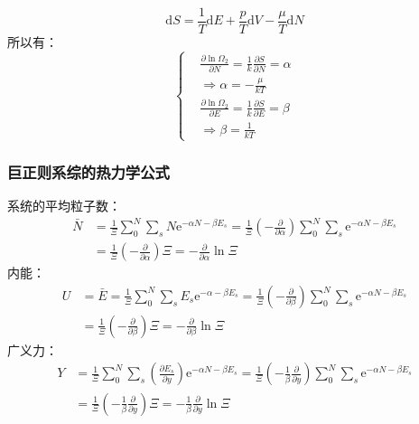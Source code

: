 \documentclass[12pt]{article}
\begin{document}
\begin{equation}
	\mathrm{d}S=\frac{1}{T}\mathrm{d}E+\frac{p}{T}\mathrm{d}V-\frac{\mu}{T}\mathrm{d}N
\end{equation}
所以有：
\begin{equation}
	\left\{
	\begin{split}
		&\frac{\partial \ln \Omega_2}{\partial N}=\frac{1}{k}\frac{\partial S}{\partial N}=\alpha\\
		&\Rightarrow \alpha=-\frac{\mu}{kT}\\
		&\frac{\partial \ln \Omega_2}{\partial E}=\frac{1}{k}\frac{\partial S}{\partial E}=\beta\\
		&\Rightarrow \beta=\frac{1}{kT}
	\end{split}
	\right.
\end{equation}

\subsubsection{巨正则系综的热力学公式}
\noindent
系统的平均粒子数：
\begin{equation}
	\begin{split}
	\bar{N}&=\frac{1}{\Xi}\sum_{0}^{N}\sum_s N\mathrm{e}^{-\alpha N-\beta E_s}=\frac{1}{\Xi}(-\frac{\partial}{\partial \alpha})\sum_{0}^{N}\sum_s\mathrm{e}^{-\alpha N-\beta E_s}\\
	&=\frac{1}{\Xi}(-\frac{\partial}{\partial \alpha})\Xi=-\frac{\partial}{\partial \alpha}\ln \Xi
		\end{split}
\end{equation}
内能：
\begin{equation}
	\begin{split}
		U&=\bar{E}=\frac{1}{\Xi}\sum_{0}^{N}\sum_s E_s\mathrm{e}^{-\alpha-\beta E_s}=\frac{1}{\Xi}(-\frac{\partial}{\partial \beta})\sum_{0}^{N}\sum_s \mathrm{e}^{-\alpha N-\beta E_s}\\
		&=\frac{1}{\Xi}(-\frac{\partial }{\partial \beta})\Xi=-\frac{\partial}{\partial \beta}\ln \Xi
	\end{split}
\end{equation}
广义力：
\begin{equation}
	\begin{split}
	Y&=\frac{1}{\Xi}\sum_{0}^{N}\sum_s(\frac{\partial E_s}{\partial y})\mathrm{e}^{-\alpha N-\beta E_s}=\frac{1}{\Xi}(-\frac{1}{\beta}\frac{\partial}{\partial y})\sum_{0}^{N}\sum_s \mathrm{e}^{-\alpha N-\beta E_s}	\\
	&=\frac{1}{\Xi}(-\frac{1}{\beta}\frac{\partial}{\partial y})\Xi=-\frac{1}{\beta}\frac{\partial}{\partial y}\ln \Xi	
\end{split}
\end{equation}
\end{document}
